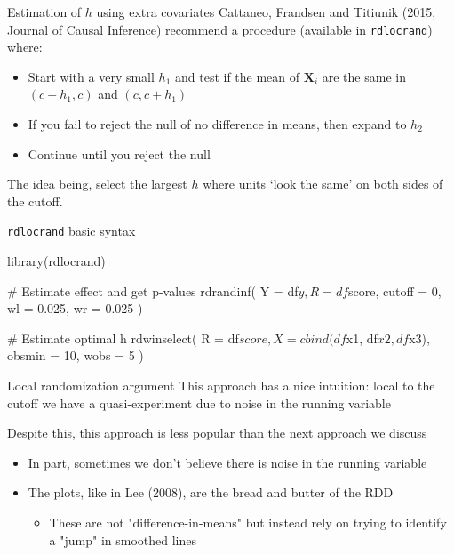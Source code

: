 \documentclass[aspectratio=169,t,11pt,table]{beamer}
\begin{document}
\begin{frame}{Estimation of $h$ using extra covariates}{}
  Cattaneo, Frandsen and Titiunik (2015, Journal of Causal Inference) recommend a procedure (available in \texttt{rdlocrand}) where:
  \begin{itemize}
    \item Start with a very small $h_1$ and test if the mean of $\bm{X}_i$ are the same in $(c - h_1, c)$ and $(c, c + h_1)$
    
    \item If you fail to reject the null of no difference in means, then expand to $h_2$
    
    \item Continue until you reject the null
  \end{itemize}

  \bigskip
  The idea being, select the largest $h$ where units `look the same' on both sides of the cutoff.
\end{frame}


\begin{frame}[fragile]{\texttt{rdlocrand} basic syntax}
  \vspace*{-\medskipamount}
  \begin{codeblock}
library(rdlocrand)

# Estimate effect and get p-values
rdrandinf(
  Y = df$y, R = df$score, cutoff = 0, wl = 0.025, wr = 0.025
)

# Estimate optimal h
rdwinselect(
  R = df$score, X = cbind(df$x1, df$x2, df$x3), obsmin = 10, wobs = 5
)
  \end{codeblock}  
\end{frame} 

\begin{frame}{Local randomization argument}
  This approach has a nice intuition: local to the cutoff we have a quasi-experiment due to noise in the running variable

  \bigskip
  Despite this, this approach is less popular than the next approach we discuss
  \begin{itemize}
    \item In part, sometimes we don't believe there is noise in the running variable
    
    \item The plots, like in Lee (2008), are the bread and butter of the RDD
    \begin{itemize}
      \item These are not "difference-in-means" but instead rely on trying to identify a "jump" in smoothed lines
    \end{itemize} 
  \end{itemize}
\end{frame}
\end{document}
